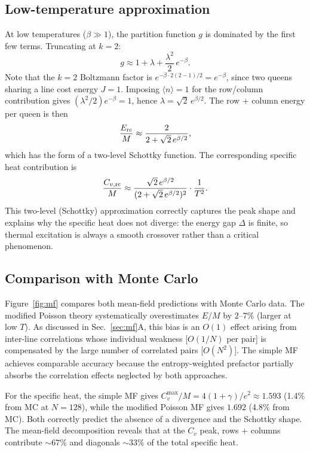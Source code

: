 \documentclass[aps, pre, reprint, amsmath, amssymb, superscriptaddress, floatfix]{revtex4-2}
\begin{document}
\subsection{Low-temperature approximation}

At low temperatures ($\beta \gg 1$), the partition function $g$ is
dominated by the first few terms.  Truncating at $k = 2$:
\begin{equation}
  g \approx 1 + \lambda + \frac{\lambda^2}{2}\,e^{-\beta}.
  \label{eq:g_trunc}
\end{equation}
Note that the $k = 2$ Boltzmann factor is $e^{-\beta \cdot 2(2-1)/2}
= e^{-\beta}$, since two queens sharing a line cost energy $J = 1$.
Imposing $\langle n \rangle = 1$ for the row/column contribution
gives $(\lambda^2/2)e^{-\beta} = 1$, hence
$\lambda = \sqrt{2}\,e^{\beta/2}$.
The row + column energy per queen is then
\begin{equation}
  \frac{E_{\rm rc}}{M} \approx \frac{2}{2 + \sqrt{2}\,e^{\beta/2}},
  \label{eq:Erc_approx}
\end{equation}
which has the form of a two-level Schottky function.  The
corresponding specific heat contribution is
\begin{equation}
  \frac{C_{v,\rm rc}}{M} \approx
  \frac{\sqrt{2}\,e^{\beta/2}}{(2 + \sqrt{2}\,e^{\beta/2})^2}
  \cdot \frac{1}{T^2}.
  \label{eq:Cv_rc_approx}
\end{equation}
This two-level (Schottky) approximation correctly captures the peak
shape and explains why the specific heat does not diverge: the
energy gap $\Delta$ is finite, so thermal excitation is always a
smooth crossover rather than a critical phenomenon.

\subsection{Comparison with Monte Carlo}

Figure~\ref{fig:mf} compares both mean-field predictions with Monte
Carlo data.  The modified Poisson theory systematically overestimates
$E/M$ by $2$--$7\%$ (larger at low $T$).
As discussed in Sec.~\ref{sec:mf}A, this bias is an $O(1)$
effect arising from inter-line correlations whose individual weakness
[$O(1/N)$ per pair] is compensated by the large number of correlated
pairs [$O(N^2)$].  The simple MF achieves comparable accuracy because the
entropy-weighted prefactor partially absorbs the correlation
effects neglected by both approaches.

For the specific heat, the simple MF gives
$C_v^{\max}/M = 4(1+\gamma)/e^2 \approx 1.593$ (1.4\% from MC at $N = 128$),
while the modified Poisson MF gives $1.692$ (4.8\% from MC).  Both
correctly predict the absence of a divergence and the Schottky shape.
The mean-field decomposition reveals that at the $C_v$ peak,
rows + columns contribute $\sim 67\%$ and diagonals $\sim 33\%$ of
the total specific heat.
\end{document}
